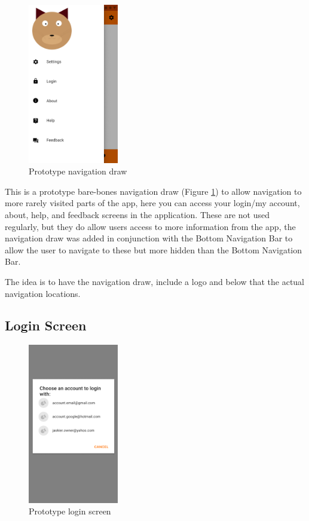 \begin{figure} [htbp!]
    \centering
    \includegraphics[height=7cm]{Images/PrototypeNavDraw.png}
    \caption{Prototype navigation draw}
    \label{fig:prototype_nav_draw}
\end{figure}

This is a prototype bare-bones navigation draw (Figure \ref{fig:prototype_nav_draw}) to allow navigation to more rarely visited parts of the app, here you can access your login/my account, about, help, and feedback screens in the application. These are not used regularly, but they do allow users access to more information from the app, the navigation draw was added in conjunction with the \gls{Bottom Navigation Bar} to allow the user to navigate to these but more hidden than the Bottom Navigation Bar.

The idea is to have the navigation draw, include a logo and below that the actual navigation locations.

\subsection{Login Screen}

\begin{figure} [htbp!]
    \centering
    \includegraphics[height=7cm]{Images/PrototypeLoginScreen.png}
    \caption{Prototype login screen}
    \label{fig:prototype_login_screen}
\end{figure}


